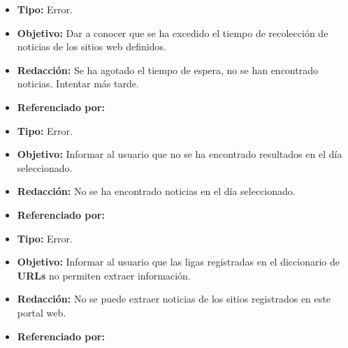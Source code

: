   
    \begin{itemize}
      \item \textbf{Tipo:} Error. 
      \item \textbf{Objetivo:}  Dar a conocer que se ha excedido el tiempo de recolección de noticias de los sitios web definidos.
      \item \textbf{Redacción:} Se ha agotado el tiempo de espera, no se han encontrado noticias. Intentar más tarde.
      \item \textbf{Referenciado por:} \\
    \end{itemize}

  \begin{itemize}
    \item \textbf{Tipo:} Error. 
    \item \textbf{Objetivo:}  Informar al usuario que no se ha encontrado resultados en el día seleccionado.
    \item \textbf{Redacción:}  No se ha encontrado noticias en el día seleccionado.

    \item \textbf{Referenciado por:} \\
  \end{itemize}

  \begin{itemize}
    \item \textbf{Tipo:} Error. 
    \item \textbf{Objetivo:}  Informar al usuario que las ligas registradas en el diccionario de \textbf{URLs} no permiten extraer información.
    \item \textbf{Redacción:} No se puede extraer noticias de los sitios registrados en este portal web.
    \item \textbf{Referenciado por:} \\
  \end{itemize}

